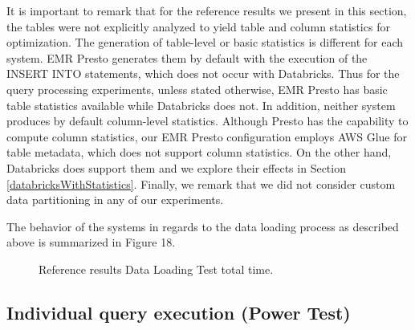 It is important to remark that for the reference results we present in this section, the tables were not explicitly analyzed to yield table and column statistics for optimization. The generation of table-level or basic statistics is different for each system. EMR Presto generates them by default with the execution of the INSERT INTO statements, which does not occur with Databricks. Thus for the query processing experiments, unless stated otherwise, EMR Presto has basic table statistics available while Databricks does not. In addition, neither system produces by default column-level statistics. Although Presto has the capability to compute column statistics, our EMR Presto configuration employs AWS Glue for table metadata, which does not support column statistics. On the other hand, Databricks does support them and we explore their effects in Section \ref{databricksWithStatistics}. Finally, we remark that we did not consider custom data partitioning in any of our experiments.

The behavior of the systems in regards to the data loading process as described above is summarized in Figure 18.

\begin{figure}
   \begin{center}
   \end{center}
   \caption{Reference results Data Loading Test total time.}
   \label{fig:referenceResultsDataLoading}
\end{figure}

\subsection{Individual query execution (Power Test)}\label{referenceResultsPowerTest}

